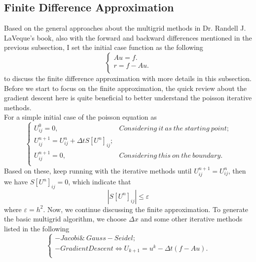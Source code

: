 \documentclass [a4paper, 12pt]{article}
\begin{document}
\subsection {Finite Difference Approximation}
Based on the general approaches about the multigrid methods in Dr. Randell J. LaVeque's book, also with the forward and backward differences mentioned in the previous subsection, I set the initial case function as the following \\
\begin {equation}
      \begin {cases}
           Au=f. \\
           r=f-Au. \\
      \end {cases}
\end {equation}
to discuss the finite difference approximation with more details in this subsection. \\
Before we start to focus on the finite approximation, the quick review about the gradient descent here is quite beneficial to better understand the poisson iterative methods. \\
For a simple initial case of the poisson equation as \\
\begin {equation}
      \begin {cases}
            U^0_{ij}=0,  &\text {$Considering \ it \ as \ the \ starting \ point$;} \\
            U^{n+1}_{ij}=U^n_{ij}+\Delta tS[U^n]_{ij}; \\
            U^{n+1}_{ij}=0,  &\text {$Considering \ this \ on \ the \ boundary$.} \\
      \end {cases}
\end {equation}
Based on these, keep running with the iterative methods until $U^{n+1}_{ij}=U^n_{ij}$, then we have $S[U^n]_{ij}=0$, which indicate that \\
\begin {equation}
      |S[U^n]_{ij}| \leqslant \varepsilon 
\end {equation}
where $\varepsilon=h^2$.
Now, we continue discussing the finite approximation. To generate the basic multigrid algorithm, we choose $\Delta x$ and some other iterative methods listed in the following \\
\begin {equation}
\begin {cases}
     -Jacobi \& \ Gauss-Seidel; \\
     -Gradient Descent \Longleftrightarrow U_{k+1}=u^k-\Delta t(f-Au). \\
\end {cases}
\end {equation}
\end{document}
